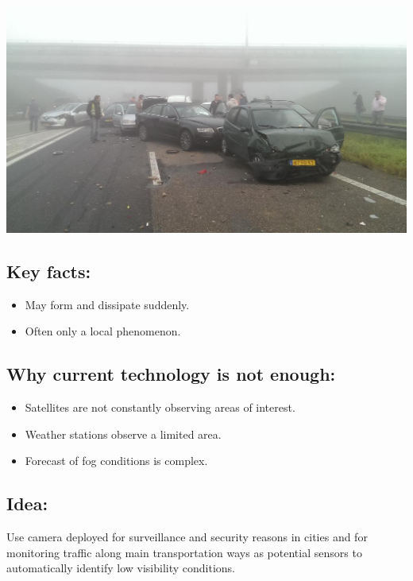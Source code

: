 \documentclass{article}
\begin{document}
\vspace{-1cm}
\begin{minipage}[b]{\columnwidth}
	\begin{center}
	\includegraphics[width=1.0\columnwidth]{Accident}
	\label{figAccident}
	\end{center}
\end{minipage}
\vspace{-2cm}

\subsection*{Key facts:}
\begin{itemize}
  \item May form and dissipate suddenly.
  \item Often only a local phenomenon.
\end{itemize}

\subsection*{Why current technology is not enough:}
\begin{itemize}
\item Satellites are not constantly observing areas of interest.
\item Weather stations observe a limited area.
\item Forecast of fog conditions is complex.
\end{itemize}

\subsection*{Idea:}
Use camera deployed for surveillance and security reasons in cities and for monitoring traffic along
main transportation ways as potential sensors to
automatically identify low visibility conditions.
\end{document}

